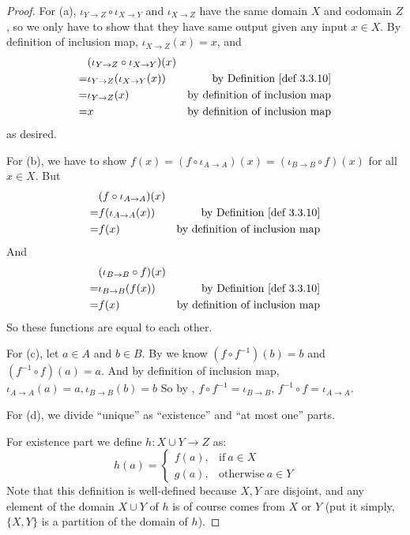 \begin{proof}
For (a), \(\iota_{Y \to Z} \circ \iota_{X \to Y}\) and \(\iota_{X \to Z}\) have the same domain \(X\) and codomain \(Z\), so we only have to show that they have same output given any input \(x \in X\).
By definition of inclusion map, \(\iota_{X \to Z}(x) = x\), and
\begin{align*}
      & (\iota_{Y \to Z} \circ \iota_{X \to Y})(x) \\
    = & \iota_{Y \to Z} (\iota_{X \to Y}(x)) & \text{by \DEF{3.3.10}} \\
    = & \iota_{Y \to Z}(x) & \text{by definition of inclusion map} \\
    = & x & \text{by definition of inclusion map} \\
\end{align*}
as desired.

For (b), we have to show \( f(x) = (f \circ \iota_{A \to A})(x) = (\iota_{B \to B} \circ f)(x) \) for all \(x \in X\).
But
\begin{align*}
      & (f \circ \iota_{A \to A})(x) \\
    = & f(\iota_{A \to A}(x)) & \text{by \DEF{3.3.10}} \\
    = & f(x) & \text{by definition of inclusion map}
\end{align*}
And
\begin{align*}
      & (\iota_{B \to B} \circ f)(x) \\
    = & \iota_{B \to B}(f(x)) & \text{by \DEF{3.3.10}} \\
    = & f(x) & \text{by definition of inclusion map}
\end{align*}
So these functions are equal to each other.

For (c), let \(a \in A\) and \(b \in B\).
By  we know \((f \circ f^{-1})(b) = b\) and \((f^{-1} \circ f)(a) = a\).
And by definition of inclusion map, \(\iota_{A \to A}(a) = a, \iota_{B \to B}(b) = b\)
So by , \(f \circ f^{-1} = \iota_{B \to B}\), \(f^{-1} \circ f = \iota_{A \to A}\).

For (d), we divide ``unique'' as ``existence'' and ``at most one'' parts.

For existence part we define \(h : X \cup Y \rightarrow Z\) as:
    \begin{equation*}
        h(a) =
        \begin{cases}
          f(a), & \text{if}\ a \in X \\
          g(a), & \text{otherwise}\ a \in Y
        \end{cases}
    \end{equation*}
Note that this definition is well-defined because \(X, Y\) are disjoint, and any element of the domain \(X \cup Y\) of \(h\) is of course comes from \(X\) or \(Y\) (put it simply, \( \{X, Y\} \) is a partition of the domain of \(h\)).


\end{proof}
